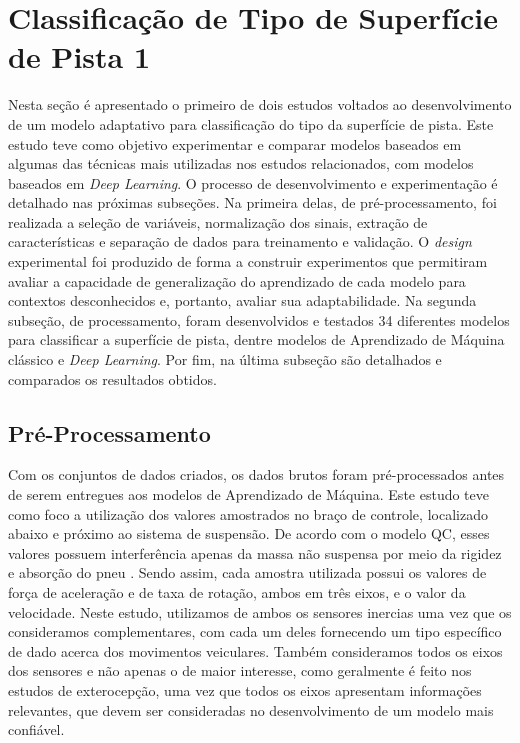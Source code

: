 \chapter{Classificação de Tipo de Superfície de Pista 1}
\label{cap:classificacao_tipo_superficie_1}

Nesta seção é apresentado o primeiro de dois estudos voltados ao desenvolvimento de um modelo adaptativo para classificação do tipo da superfície de pista. Este estudo teve como objetivo experimentar e comparar modelos baseados em algumas das técnicas mais utilizadas nos estudos relacionados, com modelos baseados em \textit{Deep Learning}. O processo de desenvolvimento e experimentação é detalhado nas próximas subseções. Na primeira delas, de pré-processamento, foi realizada a seleção de variáveis, normalização dos sinais, extração de características e separação de dados para treinamento e validação. O \textit{design} experimental foi produzido de forma a construir experimentos que permitiram avaliar a capacidade de generalização do aprendizado de cada modelo para contextos desconhecidos e, portanto, avaliar sua adaptabilidade. Na segunda subseção, de processamento, foram desenvolvidos e testados 34 diferentes modelos para classificar a superfície de pista, dentre modelos de Aprendizado de Máquina clássico e \textit{Deep Learning}. Por fim, na última subseção são detalhados e comparados os resultados obtidos. 

\section{Pré-Processamento}

Com os conjuntos de dados criados, os dados brutos foram pré-processados antes de serem entregues aos modelos de Aprendizado de Máquina. Este estudo teve como foco a utilização dos valores amostrados no braço de controle, localizado abaixo e próximo ao sistema de suspensão. De acordo com o modelo QC, esses valores possuem interferência apenas da massa não suspensa por meio da rigidez e absorção do pneu \cite{Yafeai2019}. Sendo assim, cada amostra utilizada possui os valores de força de aceleração e de taxa de rotação, ambos em três eixos, e o valor da velocidade. Neste estudo, utilizamos de ambos os sensores inercias uma vez que os consideramos complementares, com cada um deles fornecendo um tipo específico de dado acerca dos movimentos veiculares. Também consideramos todos os eixos dos sensores e não apenas o de maior interesse, como geralmente é feito nos estudos de exterocepção, uma vez que todos os eixos apresentam informações relevantes, que devem ser consideradas no desenvolvimento de um modelo mais confiável.

